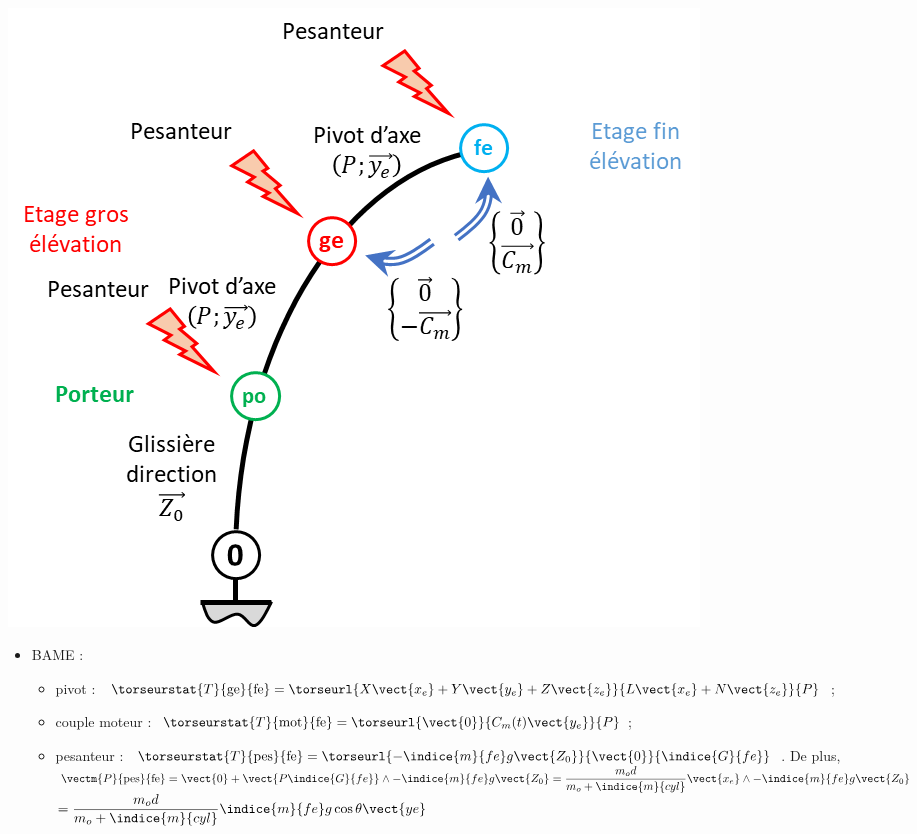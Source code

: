 \question{}
\ifprof
\begin{corrige} ~\\
\begin{minipage}[c]{.35\linewidth}
\begin{center}
\includegraphics[width=\linewidth]{images/cor_11}
\end{center}
\end{minipage}\hfill
\begin{minipage}[c]{.6\linewidth}
\begin{itemize}
\item BAME : 
\begin{itemize}
\item pivot : $\torseurstat{T}{\text{ge}}{\text{fe}} = \torseurl{X\vect{x_e}+Y\vect{y_e}+Z\vect{z_e}}{L\vect{x_e}+N\vect{z_e}}{P}$;
\item couple moteur : $\torseurstat{T}{\text{mot}}{\text{fe}} = \torseurl{\vect{0}}{C_m(t)\vect{y_e}}{P}$;
\item pesanteur : $\torseurstat{T}{\text{pes}}{\text{fe}} = \torseurl{-\indice{m}{fe}g\vect{Z_0}}{\vect{0}}{\indice{G}{fe}}$. De plus, 
$\vectm{P}{\text{pes}}{\text{fe}} = \vect{0} + \vect{P\indice{G}{fe}}\wedge -\indice{m}{fe}g\vect{Z_0} =  \dfrac{m_od}{m_o+\indice{m}{cyl}}\vect{x_e} \wedge -\indice{m}{fe}g\vect{Z_0} $  $= \dfrac{m_od}{m_o+\indice{m}{cyl}}\indice{m}{fe}g\cos\theta \vect{ye} $
\end{itemize}
\end{itemize}
\end{minipage}


\end{corrige}

